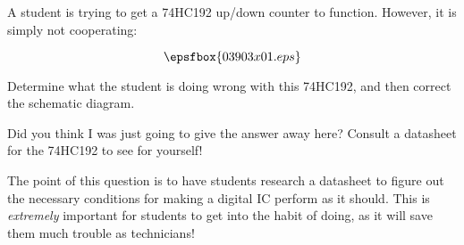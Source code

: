 

A student is trying to get a 74HC192 up/down counter to function.  However, it is simply not cooperating:

$$\epsfbox{03903x01.eps}$$

Determine what the student is doing wrong with this 74HC192, and then correct the schematic diagram.







Did you think I was just going to give the answer away here?  Consult a datasheet for the 74HC192 to see for yourself!







The point of this question is to have students research a datasheet to figure out the necessary conditions for making a digital IC perform as it should.  This is {\it extremely} important for students to get into the habit of doing, as it will save them much trouble as technicians!




